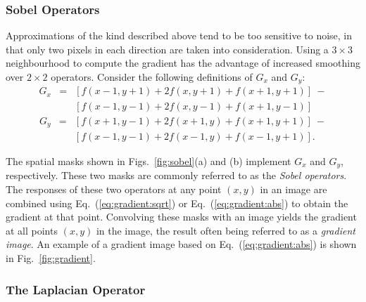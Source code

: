 \subsubsection{Sobel Operators}

Approximations of the kind described above tend to be too sensitive to
noise, in that only two pixels in each direction are taken into
consideration.  Using a $3\times 3$ neighbourhood to compute the
gradient has the advantage of increased smoothing over $2\times 2$
operators.  Consider the following definitions of $G_{x}$ and $G_{y}$:
\begin{equation}
  \begin{array}{lll}
    G_{x} & = & [f(x-1,y+1)+2f(x,y+1)+f(x+1,y+1)]\ - \\
          &   & [f(x-1,y-1)+2f(x,y-1)+f(x+1,y-1)]
  \end{array}
\end{equation}
\begin{equation}
  \begin{array}{lll}
    G_{y} & = & [f(x+1,y-1)+2f(x+1,y)+f(x+1,y+1)]\ - \\
          &   & [f(x-1,y-1)+2f(x-1,y)+f(x-1,y+1)]\mbox{.}
  \end{array}
\end{equation}


The spatial masks shown in Figs.~\ref{fig:sobel}(a) and (b) implement
$G_{x}$ and $G_{y}$, respectively.  These two masks are commonly
referred to as the {\em Sobel operators\/}.  The responses of these
two operators at any point $(x,y)$ in an image are combined using
Eq.~(\ref{eq:gradient:sqrt}) or Eq.~(\ref{eq:gradient:abs}) to obtain
the gradient at that point.  Convolving these masks with an image
yields the gradient at all points $(x,y)$ in the image, the result
often being referred to as a {\em gradient image\/}.  An example of a
gradient image based on Eq.~(\ref{eq:gradient:abs}) is shown in
Fig.~\ref{fig:gradient}.


\subsubsection{The Laplacian Operator}

